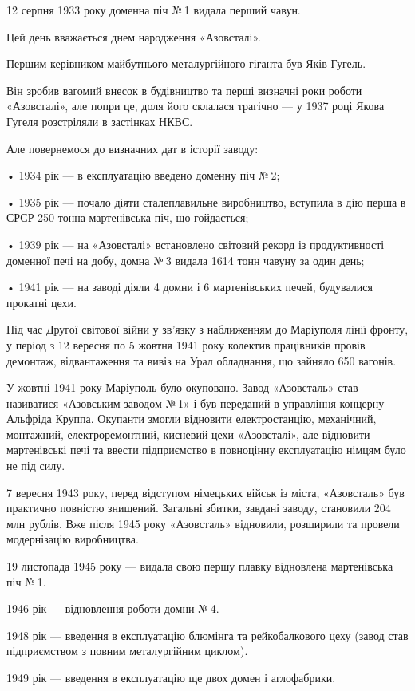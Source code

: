 12 серпня 1933 року доменна піч № 1 видала перший чавун.

Цей день вважається днем народження «Азовсталі».

Першим керівником майбутнього металургійного гіганта був Яків Гугель.

Він зробив вагомий внесок в будівництво та перші визначні роки роботи
«Азовсталі», але попри це, доля його склалася трагічно — у 1937 році Якова
Гугеля розстріляли в застінках НКВС.

Але повернемося до визначних дат в історії заводу:

• 1934 рік — в експлуатацію введено доменну піч № 2;

• 1935 рік — почало діяти сталеплавильне виробництво, вступила в дію перша в
СРСР 250-тонна мартенівська піч, що гойдається;

• 1939 рік — на «Азовсталі» встановлено світовий рекорд із продуктивності
доменної печі на добу, домна № 3 видала 1614 тонн чавуну за один день;

• 1941 рік — на заводі діяли 4 домни і 6 мартенівських печей, будувалися
прокатні цехи.

Під час Другої світової війни у зв'язку з наближенням до Маріуполя лінії
фронту, у період з 12 вересня по 5 жовтня 1941 року колектив працівників провів
демонтаж, відвантаження та вивіз на Урал обладнання, що зайняло 650 вагонів.

У жовтні 1941 року Маріуполь було окуповано. Завод «Азовсталь» став називатися
«Азовським заводом № 1» і був переданий в управління концерну Альфріда Круппа.
Окупанти змогли відновити електростанцію, механічний, монтажний,
електроремонтний, кисневий цехи «Азовсталі», але відновити мартенівські печі та
ввести підприємство в повноцінну експлуатацію німцям було не під силу.

7 вересня 1943 року, перед відступом німецьких військ із міста, «Азовсталь» був
практично повністю знищений. Загальні збитки, завдані заводу, становили 204 млн
рублів. Вже після 1945 року «Азовсталь» відновили, розширили та провели
модернізацію виробництва.

19 листопада 1945 року — видала свою першу плавку відновлена мартенівська піч
№ 1.

1946 рік — відновлення роботи домни № 4.

1948 рік — введення в експлуатацію блюмінга та рейкобалкового цеху (завод став
підприємством з повним металургійним циклом).

1949 рік — введення в експлуатацію ще двох домен і аглофабрики.

